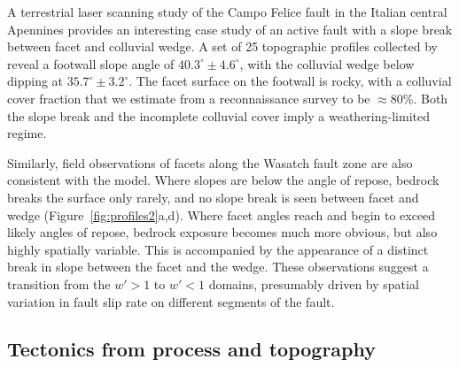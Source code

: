 A terrestrial laser scanning study of the Campo Felice fault in the Italian central Apennines provides an interesting case study of an active fault with a slope break between facet and colluvial wedge. A set of 25 topographic profiles collected by \citet{wilkinson2015slip} reveal a footwall slope angle of $40.3^\circ\pm 4.6^\circ$, with the colluvial wedge below dipping at $35.7^\circ\pm3.2^\circ$. The facet surface on the footwall is rocky, with a colluvial cover fraction that we estimate from a reconnaissance survey to be $\approx 80$\%. Both the slope break and the incomplete colluvial cover imply a weathering-limited regime. 

Similarly, field observations of facets along the Wasatch fault zone are also consistent with the model. Where slopes are below the angle of repose, bedrock breaks the surface only rarely, and no slope break is seen between facet and wedge (Figure~\ref{fig:profiles2}a,d). Where facet angles reach and begin to exceed likely angles of repose, bedrock exposure becomes much more obvious, but also highly spatially variable. This is accompanied by the appearance of a distinct break in slope between the facet and the wedge. These observations suggest a transition from the $w' > 1$ to $w' < 1$ domains, presumably driven by spatial variation in fault slip rate on different segments of the fault.

\subsection{Tectonics from process and topography}

